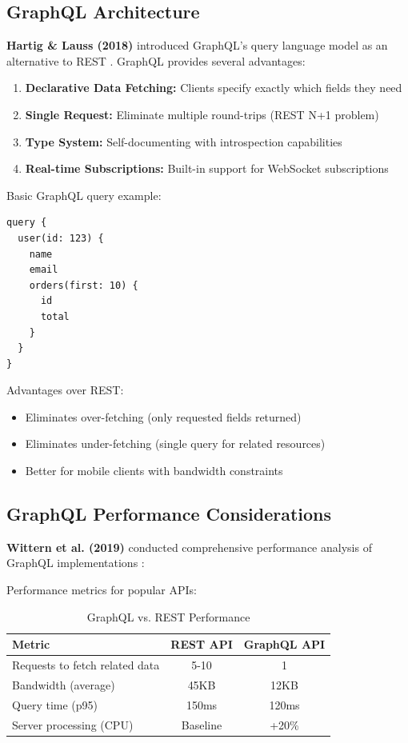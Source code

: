 \documentclass[conference]{IEEEtran}
\begin{document}
\subsection{GraphQL Architecture}

\textbf{Hartig \& Lauss (2018)} introduced GraphQL's query language model as an alternative to REST \cite{hartig2018semantics}. GraphQL provides several advantages:

\begin{enumerate}
    \item \textbf{Declarative Data Fetching:} Clients specify exactly which fields they need
    \item \textbf{Single Request:} Eliminate multiple round-trips (REST N+1 problem)
    \item \textbf{Type System:} Self-documenting with introspection capabilities
    \item \textbf{Real-time Subscriptions:} Built-in support for WebSocket subscriptions
\end{enumerate}

Basic GraphQL query example:
\begin{verbatim}
query {
  user(id: 123) {
    name
    email
    orders(first: 10) {
      id
      total
    }
  }
}
\end{verbatim}

Advantages over REST:
\begin{itemize}
    \item Eliminates over-fetching (only requested fields returned)
    \item Eliminates under-fetching (single query for related resources)
    \item Better for mobile clients with bandwidth constraints
\end{itemize}

\subsection{GraphQL Performance Considerations}

\textbf{Wittern et al. (2019)} conducted comprehensive performance analysis of GraphQL implementations \cite{wittern2019performance}:

Performance metrics for popular APIs:

\begin{table}[h]
\centering
\caption{GraphQL vs. REST Performance}
\begin{tabular}{|l|c|c|}
\hline
\textbf{Metric} & \textbf{REST API} & \textbf{GraphQL API} \\
\hline
Requests to fetch related data & 5-10 & 1 \\
Bandwidth (average) & 45KB & 12KB \\
Query time (p95) & 150ms & 120ms \\
Server processing (CPU) & Baseline & +20\% \\
\hline
\end{tabular}
\end{table}
\end{document}
